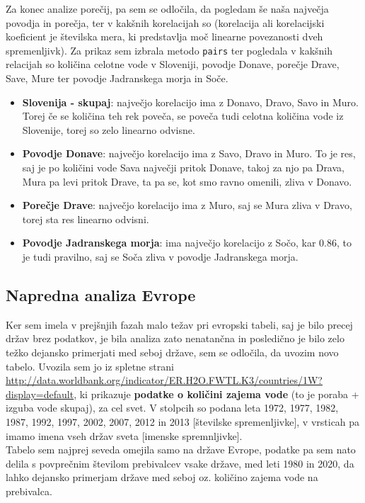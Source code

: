 \documentclass[11pt,a4paper]{article}
\begin{document}
\newpage

Za konec analize porečij, pa sem se odločila, da pogledam še naša največja povodja in porečja, ter v kakšnih korelacijah so (korelacija ali korelacijski koeficient je številska mera, ki predstavlja moč linearne povezanosti dveh spremenljivk). Za prikaz sem izbrala metodo \verb|pairs| ter pogledala v kakšnih relacijah so količina celotne vode v Sloveniji, povodje Donave, porečje Drave, Save, Mure ter povodje Jadranskega morja in Soče.


\begin{itemize}
\item{\textbf{Slovenija - skupaj}: največjo korelacijo ima z Donavo, Dravo, Savo in Muro. Torej če se količina teh rek poveča, se poveča tudi celotna količina vode iz Slovenije, torej so zelo linearno odvisne.}

\item{\textbf{Povodje Donave}: največjo korelacijo ima z Savo, Dravo in Muro. To je res, saj je po količini vode Sava največji pritok Donave, takoj za njo pa Drava, Mura pa levi pritok Drave, ta pa se, kot smo ravno omenili, zliva v Donavo.}

\item{\textbf{Porečje Drave}: največjo korelacijo ima z Muro, saj se Mura zliva v Dravo, torej sta res linearno odvisni.}

\item{\textbf{Povodje Jadranskega morja}: ima največjo korelacijo z Sočo, kar 0.86, to je tudi pravilno, saj se Soča zliva v povodje Jadranskega morja.}
\end{itemize}

\newpage
\subsection{Napredna analiza Evrope}
Ker sem imela v prejšnjih fazah malo težav pri evropski tabeli, saj je bilo precej držav brez podatkov, je bila analiza zato nenatančna in posledično je bilo zelo težko dejansko primerjati med seboj države, sem se odločila, da uvozim novo tabelo. Uvozila sem jo iz spletne strani \url{http://data.worldbank.org/indicator/ER.H2O.FWTL.K3/countries/1W?display=default}, ki pri\-ka\-zu\-je \textbf{podatke o količini zajema vode} (to je poraba + izguba vode skupaj), za cel svet. V stolpcih so podana leta 1972, 1977, 1982, 1987, 1992, 1997, 2002, 2007, 2012 in 2013 [številske spremenljivke], v vrsticah pa imamo imena vseh držav sveta [imenske spremnljivke].\\ 
Tabelo sem najprej seveda omejila samo na države Evrope, podatke pa sem nato delila s povprečnim številom prebivalcev vsake države, med leti 1980 in 2020, da lahko dejansko primerjam države med seboj oz. količino zajema vode na prebivalca.\\
\end{document}
